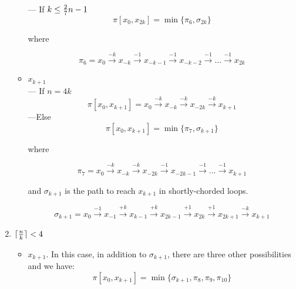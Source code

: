\begin{enumerate}
\begin{itemize}
--- If    $k \leq {2\over7}n-1$
$$ \pi[x_0,x_{2k}] = \min \{ \pi_6,  \sigma_{2k}\}$$
 
 where 
 
$$\pi_6 = x_{0} \xrightarrow {-k} x_{-k} \xrightarrow {-1} x_{-k-1} \xrightarrow {-1} x_{-k-2}\xrightarrow {-1} ... \xrightarrow {-1} x_{2k}$$

 

 \item $x_{k+1}$    \\
--- If $n=4k$
$$ \pi[x_0,x_{k+1}]  = x_{0} \xrightarrow {-k} x_{-k} \xrightarrow {-k} x_{-2k} \xrightarrow {-k} x_{k+1}$$
---Else 
$$ \pi[x_0,x_{k+1}] = \min \{ \pi_7,  \sigma_{k+1}\}$$

where
 
$$ \pi_7 = x_{0} \xrightarrow {-k} x_{-k} \xrightarrow {-k} x_{-2k} \xrightarrow {-1} x_{-2k-1}\xrightarrow {-1} ... \xrightarrow {-1} x_{k+1}$$

and $ \sigma_{k+1}$ is the path to reach $x_{k+1}$ in shortly-chorded loops.

$$  \sigma_{k+1} =   x_{0} \xrightarrow {-1} x_{-1} \xrightarrow {+k} x_{k-1} \xrightarrow {+k} x_{2k-1}
 \xrightarrow {+1}  x_{2k}\xrightarrow {+1} x_{2k+1} \xrightarrow {-k} x_{k+1}$$


\end{itemize}

\item  $\lceil {n \over k} \rceil<  4$ 

\begin{itemize}
 \item $x_{k+1}$.
In this case, in addition to $\sigma_{k+1}$, there are three other  possibilities and we have:
$$ \pi[x_0,x_{k+1}] = \min \{\sigma_{k+1}, \pi_8,\pi_9,\pi_{10}\}$$


\end{itemize}
\end{enumerate}
